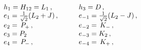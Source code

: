 \begin{equation}
 \label{lulymo3.11}
 \begin{array}{ll}
h_1 = H_{12} = L_1\, , \qquad
& h_3 = D \, ,
\cr
e_1 =\frac{1}{\sqrt{2}} (L_2 + J) \, ,
\qquad
 & e_{-1}= \frac{1}{\sqrt{2}} (L_2 -J)\, ,
 \cr
e_2 =
\, P_{+}
 \, ,
& e_{-2} =
 \, K_{-}
 \, ,
\cr
e_3 = P_2 & e_{-3} = K_2 \, ,
\cr
e_4  =
\,  P_{-}
\, ,
& e_{-4}  =
 \, K_{+}
 \, ,
 \end{array}
 \end{equation}

